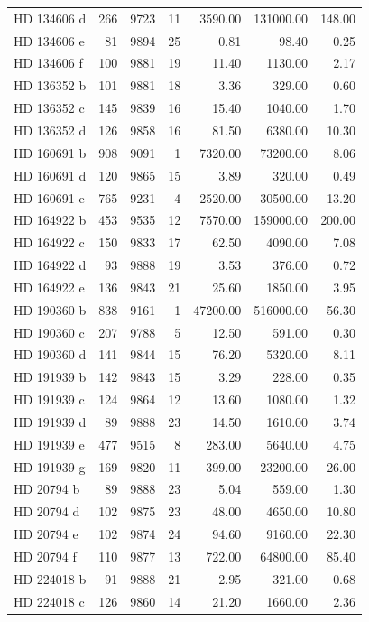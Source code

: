 \begin{table}
\begin{tabular}{lrrrrrr}
HD 134606 d & 266 & 9723 & 11 & 3590.00 & 131000.00 & 148.00 \\
HD 134606 e & 81 & 9894 & 25 & 0.81 & 98.40 & 0.25 \\
HD 134606 f & 100 & 9881 & 19 & 11.40 & 1130.00 & 2.17 \\
HD 136352 b & 101 & 9881 & 18 & 3.36 & 329.00 & 0.60 \\
HD 136352 c & 145 & 9839 & 16 & 15.40 & 1040.00 & 1.70 \\
HD 136352 d & 126 & 9858 & 16 & 81.50 & 6380.00 & 10.30 \\
HD 160691 b & 908 & 9091 & 1 & 7320.00 & 73200.00 & 8.06 \\
HD 160691 d & 120 & 9865 & 15 & 3.89 & 320.00 & 0.49 \\
HD 160691 e & 765 & 9231 & 4 & 2520.00 & 30500.00 & 13.20 \\
HD 164922 b & 453 & 9535 & 12 & 7570.00 & 159000.00 & 200.00 \\
HD 164922 c & 150 & 9833 & 17 & 62.50 & 4090.00 & 7.08 \\
HD 164922 d & 93 & 9888 & 19 & 3.53 & 376.00 & 0.72 \\
HD 164922 e & 136 & 9843 & 21 & 25.60 & 1850.00 & 3.95 \\
HD 190360 b & 838 & 9161 & 1 & 47200.00 & 516000.00 & 56.30 \\
HD 190360 c & 207 & 9788 & 5 & 12.50 & 591.00 & 0.30 \\
HD 190360 d & 141 & 9844 & 15 & 76.20 & 5320.00 & 8.11 \\
HD 191939 b & 142 & 9843 & 15 & 3.29 & 228.00 & 0.35 \\
HD 191939 c & 124 & 9864 & 12 & 13.60 & 1080.00 & 1.32 \\
HD 191939 d & 89 & 9888 & 23 & 14.50 & 1610.00 & 3.74 \\
HD 191939 e & 477 & 9515 & 8 & 283.00 & 5640.00 & 4.75 \\
HD 191939 g & 169 & 9820 & 11 & 399.00 & 23200.00 & 26.00 \\
HD 20794 b & 89 & 9888 & 23 & 5.04 & 559.00 & 1.30 \\
HD 20794 d & 102 & 9875 & 23 & 48.00 & 4650.00 & 10.80 \\
HD 20794 e & 102 & 9874 & 24 & 94.60 & 9160.00 & 22.30 \\
HD 20794 f & 110 & 9877 & 13 & 722.00 & 64800.00 & 85.40 \\
HD 224018 b & 91 & 9888 & 21 & 2.95 & 321.00 & 0.68 \\
HD 224018 c & 126 & 9860 & 14 & 21.20 & 1660.00 & 2.36 \\

\end{tabular}
\end{table}
